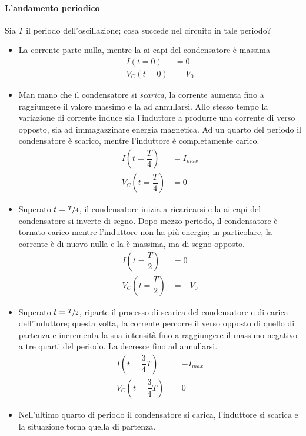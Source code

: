\paragraph{L'andamento periodico}
Sia $T$ il periodo dell'oscillazione; cosa succede nel circuito in tale periodo?
\begin{itemize}
	\item La corrente parte nulla, mentre la \ddp ai capi del condensatore è massima
	\begin{align*}
		I(t=0)&=0\\
		V_C(t=0)&=V_0
	\end{align*}
	\item Man mano che il condensatore si \textit{scarica}, la corrente aumenta fino a raggiungere il valore massimo e la \ddp ad annullarsi. Allo stesso tempo la variazione di corrente induce sia l'induttore a produrre una corrente di verso opposto, sia ad immagazzinare energia magnetica. Ad un quarto del periodo il condensatore è scarico, mentre l'induttore è completamente carico.
	\begin{align*}
	 	I\left(t=\dfrac{T}{4}\right)&=I_{max}\\
	 	V_C\left(t=\dfrac{T}{4}\right)&=0
	 \end{align*}
	\item Superato $t=\nicefrac{T}{4}$, il condensatore inizia a ricaricarsi e la \ddp ai capi del condensatore si inverte di segno. Dopo mezzo periodo, il condensatore è tornato carico mentre l'induttore non ha più energia; in particolare, la corrente è di nuovo nulla e la \ddp è massima, ma di segno opposto.
	\begin{align*}
		I\left(t=\dfrac{T}{2}\right)&=0\\
		V_C\left(t=\dfrac{T}{2}\right)&=-V_0
	\end{align*}
	\item Superato $t=\nicefrac{T}{2}$, riparte il processo di scarica del condensatore e di carica dell'induttore; questa volta, la corrente percorre il verso opposto di quello di partenza e incrementa la sua intensità fino a raggiungere il massimo negativo a tre quarti del periodo. La \ddp decresce fino ad annullarsi.
	\begin{align*}
		I\left(t=\dfrac{3}{4}T\right)&=-I_{max}\\
		V_C\left(t=\dfrac{3}{4}T\right)&=0
	\end{align*}
	\item Nell'ultimo quarto di periodo il condensatore si carica, l'induttore si scarica e la situazione torna quella di partenza.
\end{itemize}
